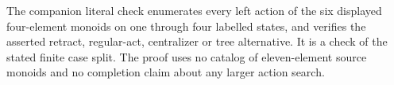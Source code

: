 \begin{remark*}
The companion literal check enumerates every left action
of the six displayed four-element monoids on one through
four labelled states, and verifies the asserted retract,
regular-act, centralizer or tree alternative. It is a
check of the stated finite case split. The proof uses no
catalog of eleven-element source monoids and no completion
claim about any larger action search.
\end{remark*}
